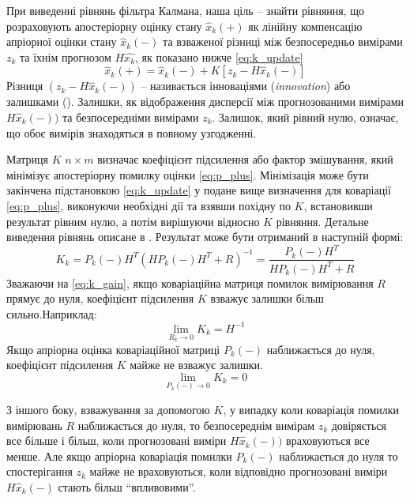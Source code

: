 При виведенні рівнянь фільтра Калмана, наша ціль -- знайти рівняння, що 
розраховують апостеріорну оцінку стану $\hat{x}_{k}(+)$ як лінійну компенсацію
апріорної оцінки стану $\hat{x}_{k}(-)$ та взваженої різниці між безпосередньо
вимірами $z_{k}$ та їхнім прогнозом $H\hat{x_{k}}$, як показано нижче \eqref{eq:k_update}
\begin{equation}
  \label{eq:k_update}
 \hat{x}_{k}(+)= \hat{x}_{k}(-) + K\left[z_{k}-H\hat{x}_{k}(-)\right]
\end{equation}
Різниця $(z_{k}-H\hat{x}_{k}(-))$  -- називається інноваціями (\textit{innovation}) 
або залишками (). Залишки, як відображення дисперсії між прогнозованими
вимірами $H\hat{x}_{k}(-))$ та безпосередніми вимірами $z_{k}$. Залишок, який
рівний нулю, означає, що обоє вимірів знаходяться в повному узгодженні.

Матриця $K$ $n \times m$ визначає коефіцієнт підсилення або фактор
змішування, який мінімізує апостеріорну помилку оцінки \eqref{eq:p_plus}.
Мінімізація може бути закінчена підстановкою \eqref{eq:k_update} у подане 
вище визначення для коваріації \eqref{eq:p_plus}, виконуючи необхідні дії та
взявши похідну по $K$, встановивши результат рівним нулю, а потім
вирішуючи відносно $K$ рівняння. Детальне виведення рівнянь описане в \cite{bib:gps_ins}.
Результат може бути отриманий в наступній формі:
\begin{equation}
  \label{eq:k_gain}
  K_{k}=P_{k}(-)H^{T}(HP_{k}(-)H^{T}+R)^{-1} = \frac{P_{k}(-)H^{T}}{HP_{k}(-)H^{T}+R} 
\end{equation}
Зважаючи на \eqref{eq:k_gain}, якщо коваріаційна матриця помилок вимірювання
$R$ прямує до нуля, коефіцієнт підсилення $K$ взважує залишки 
більш сильно.Наприклад:
\begin{equation}
  \label{eq:lim_R}
  \displaystyle\lim_{R_{k}\to 0} K_{k} = H^{-1}
\end{equation}
Якщо апріорна оцінка коваріаційної матриці $P_{k}(-)$ наближається
до нуля, коефіцієнт підсилення $K$ майже не взважує залишки.
\begin{equation}
  \label{eq:lim_P_minus}
  \displaystyle\lim_{P_{k}(-)\to 0} K_{k} = 0
\end{equation}

З іншого боку, взважування за допомогою $K$, у випадку коли коваріація 
помилки вимірювань $R$ наближається до нуля, то безпосереднім вимірам
$z_{k}$ довіряється все більше і більш, коли прогнозовані виміри $H\hat{x}_{k}(-))$
враховуються все менше. Але якщо апріорна коваріація помилки $P_{k}(-)$ наближається
до нуля то спостерігання $z_{k}$ майже не враховуються, коли відповідно
прогнозовані виміри $H\hat{x}_{k}(-)$ стають більш ``впливовими''.

